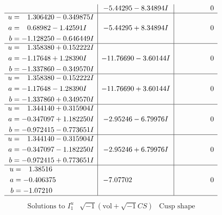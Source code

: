 \documentclass[1p]{elsarticle_modified}
\theoremstyle{definition}
\newcommand{\I}{\sqrt{-1}}
\begin{document}
$$\begin{array}{c|c|c}
 & -5.44295 - 8.34894 I & \phantom{-0.000000 } 0 \\ \hline\begin{aligned}
u &= \phantom{-}1.306420 - 0.349875 I \\
a &= \phantom{-}0.68982 - 1.42591 I \\
b &= -1.128250 - 0.646449 I\end{aligned}
 & -5.44295 + 8.34894 I & \phantom{-0.000000 } 0 \\ \hline\begin{aligned}
u &= \phantom{-}1.358380 + 0.152222 I \\
a &= -1.17648 + 1.28390 I \\
b &= -1.337860 - 0.349570 I\end{aligned}
 & -11.76690 - 3.60144 I & \phantom{-0.000000 } 0 \\ \hline\begin{aligned}
u &= \phantom{-}1.358380 - 0.152222 I \\
a &= -1.17648 - 1.28390 I \\
b &= -1.337860 + 0.349570 I\end{aligned}
 & -11.76690 + 3.60144 I & \phantom{-0.000000 } 0 \\ \hline\begin{aligned}
u &= \phantom{-}1.344140 + 0.315904 I \\
a &= -0.347097 + 1.182250 I \\
b &= -0.972415 - 0.773651 I\end{aligned}
 & -2.95246 - 6.79976 I & \phantom{-0.000000 } 0 \\ \hline\begin{aligned}
u &= \phantom{-}1.344140 - 0.315904 I \\
a &= -0.347097 - 1.182250 I \\
b &= -0.972415 + 0.773651 I\end{aligned}
 & -2.95246 + 6.79976 I & \phantom{-0.000000 } 0 \\ \hline\begin{aligned}
u &= \phantom{-}1.38516\phantom{ +0.000000I} \\
a &= -0.406375\phantom{ +0.000000I} \\
b &= -1.07210\phantom{ +0.000000I}\end{aligned}
 & -7.07702\phantom{ +0.000000I} & \phantom{-0.000000 } 0\\
 \hline 
 \end{array}$$\newpage$$\begin{array}{c|c|c}  
\text{Solutions to }I^u_{1}& \I (\text{vol} + \sqrt{-1}CS) & \text{Cusp shape}\\

\end{array}$$
\end{document}
